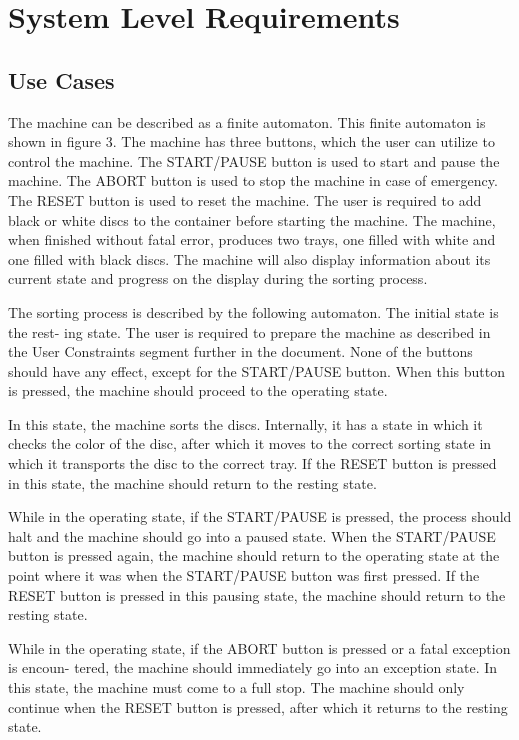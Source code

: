 \documentclass[a4paper,oneside,11pt]{article}
\begin{document}
\section{System Level Requirements}
\subsection{Use Cases}
The machine can be described as a finite automaton. This finite automaton is shown in figure
3. The machine has three buttons, which the user can utilize to control the machine. The
START/PAUSE button is used to start and pause the machine. The ABORT button is used to
stop the machine in case of emergency. The RESET button is used to reset the machine. The
user is required to add black or white discs to the container before starting the machine.
The machine, when finished without fatal error, produces two trays, one filled with white
and one filled with black discs. The machine will also display information about its current
state and progress on the display during the sorting process.

The sorting process is described by the following automaton. The initial state is the rest-
ing state. The user is required to prepare the machine as described in the User Constraints segment further in the document. None of the buttons should have any effect, except for the
START/PAUSE button. When this button is pressed, the machine should proceed to the
operating state.

In this state, the machine sorts the discs. Internally, it has a state in which it checks the
color of the disc, after which it moves to the correct sorting state in which it transports the disc
to the correct tray. If the RESET button is pressed in this state, the machine should return to
the resting state.

While in the operating state, if the START/PAUSE is pressed, the process should halt
and the machine should go into a paused state. When the START/PAUSE button is pressed
again, the machine should return to the operating state at the point where it was when the
START/PAUSE button was first pressed. If the RESET button is pressed in this pausing state,
the machine should return to the resting state.

While in the operating state, if the ABORT button is pressed or a fatal exception is encoun-
tered, the machine should immediately go into an exception state. In this state, the machine
must come to a full stop. The machine should only continue when the RESET button is pressed,
after which it returns to the resting state.
\end{document}
